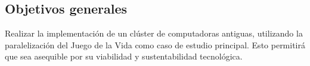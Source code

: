 \subsection{Objetivos generales}
\label{section:objgen}

Realizar la implementación de un clúster de computadoras antiguas, utilizando la paralelización del Juego de la Vida como caso de estudio principal. Esto permitirá que sea asequible por su viabilidad y sustentabilidad tecnológica.